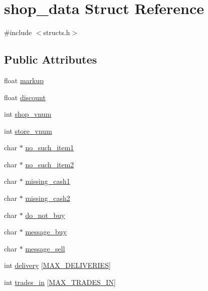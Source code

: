 \hypertarget{structshop__data}{\section{shop\-\_\-data Struct Reference}
\label{structshop__data}
}


{\ttfamily \#include $<$structs.\-h$>$}

\subsection*{Public Attributes}
\begin{DoxyCompactItemize}
\item 
float \hyperlink{structshop__data_ae5066c93a9db681d20b8dee817aebb23}{markup}
\item 
float \hyperlink{structshop__data_aaa8ef610845d6a330c6993fb88fa1e3d}{discount}
\item 
int \hyperlink{structshop__data_aff411fdd205015f941000f5fb060a297}{shop\-\_\-vnum}
\item 
int \hyperlink{structshop__data_a5e341c298ea7232f1f53a447ce393c7b}{store\-\_\-vnum}
\item 
char $\ast$ \hyperlink{structshop__data_a42848ea79684cd35702458db76c80cc8}{no\-\_\-such\-\_\-item1}
\item 
char $\ast$ \hyperlink{structshop__data_ac8ad8d4480d25d774cf139045fe9aa81}{no\-\_\-such\-\_\-item2}
\item 
char $\ast$ \hyperlink{structshop__data_a219bc60ee1cdb900d0c5d042791a50c1}{missing\-\_\-cash1}
\item 
char $\ast$ \hyperlink{structshop__data_a26a1ac8ac4f4b06ec12a9ad5b6af0d48}{missing\-\_\-cash2}
\item 
char $\ast$ \hyperlink{structshop__data_a6cc84ced95b2f064fbf2595e7a5966ae}{do\-\_\-not\-\_\-buy}
\item 
char $\ast$ \hyperlink{structshop__data_a5e930437f5ead5944e27239ed7f01e09}{message\-\_\-buy}
\item 
char $\ast$ \hyperlink{structshop__data_a21c766be59930761540197842140c941}{message\-\_\-sell}
\item 
int \hyperlink{structshop__data_aa1d3a8cef458455a884c2815c32403f6}{delivery} \mbox{[}\hyperlink{structs_8h_a4cfec23515b010359571393bfee844f6}{M\-A\-X\-\_\-\-D\-E\-L\-I\-V\-E\-R\-I\-E\-S}\mbox{]}
\item 
int \hyperlink{structshop__data_aa571b13eddacde07b3e0ec0bb329efbf}{trades\-\_\-in} \mbox{[}\hyperlink{structs_8h_a4ca5671bf6a82204eb2e5e09d868b7af}{M\-A\-X\-\_\-\-T\-R\-A\-D\-E\-S\-\_\-\-I\-N}\mbox{]}

\end{DoxyCompactItemize}
